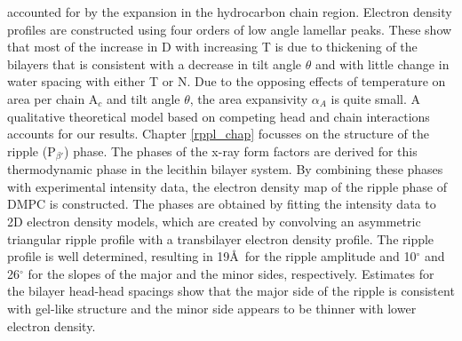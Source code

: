 accounted for by the expansion in the hydrocarbon chain region. Electron 
density profiles are constructed using four orders of low angle lamellar 
peaks.  These show that most of the increase in D with increasing T is due 
to thickening of the bilayers that is consistent with a decrease in tilt 
angle $\theta$ and with little change in water spacing with either T or N.  
Due to the opposing effects of temperature on area per chain A$_c$ and tilt 
angle $\theta$, the area expansivity $\alpha_A$ is quite small. A qualitative 
theoretical model based on competing head and chain interactions accounts for 
our results.
Chapter \ref{rppl_chap} focusses on the structure of the ripple
(P$_{\beta '}$) phase. The phases of the x-ray form factors are derived for 
this thermodynamic phase in the lecithin bilayer system. By combining these 
phases with experimental intensity data, the electron density map of the 
ripple phase of DMPC is constructed. The phases are obtained by fitting the 
intensity data to 2D electron density models, which are created by convolving 
an asymmetric triangular ripple profile with a transbilayer electron density 
profile. The ripple profile is well determined, resulting in 19\AA\ for the 
ripple amplitude and 10$^{\circ}$ and 26$^{\circ}$ for the slopes of the major 
and the minor sides, respectively. Estimates for the bilayer head-head 
spacings show that the major side of the ripple is consistent with gel-like 
structure and the minor side appears to be thinner with lower electron density.
